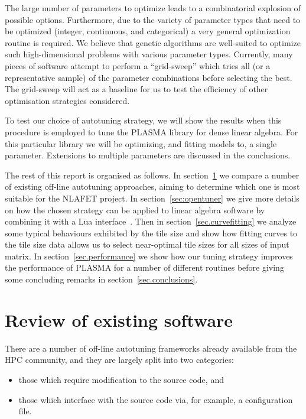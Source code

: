 \documentclass[a4paper,12pt]{article}
\begin{document}
The large number of parameters to optimize leads to a combinatorial
explosion of possible options.
Furthermore,
due to the variety of parameter types that need to be optimized
(integer, continuous, and categorical)
a very general optimization routine is required.
We believe that genetic algorithms are well-suited to optimize
such high-dimensional problems with various parameter types.
Currently,
many pieces of software attempt to perform a ``grid-sweep''
which tries all (or a representative sample)
of the parameter combinations before selecting the best.
The grid-sweep will act as a baseline for us to test the efficiency of
other optimisation strategies considered.

To test our choice of autotuning strategy,
we will show the results when this procedure is employed to tune
the PLASMA library for dense linear algebra.
For this particular library we will be optimizing,
and fitting models to,
a single parameter.
Extensions to multiple parameters are discussed in the conclusions.

The rest of this report is organised as follows.
In section~\ref{sec.review} we compare a number of existing
off-line autotuning approaches,
aiming to determine which one is most suitable
for the NLAFET project.
In section~\ref{sec:opentuner} we give more details
on how the chosen strategy can be applied to linear algebra software
by combining it with a Lua interface~\cite{ierusalimschy2006lua}.
Then in section~\ref{sec.curvefitting} we analyze some typical
behaviours exhibited by the tile size and show how fitting curves
to the tile size data allows us to select near-optimal tile sizes
for all sizes of input matrix.
In section~\ref{sec.performance} we show how our
tuning strategy improves the performance of PLASMA for
a number of different routines before giving some concluding remarks in
section~\ref{sec.conclusions}.

\section{Review of existing software}
\label{sec.review}
There are a number of off-line autotuning frameworks already
available from the HPC community,
and they are largely split into two categories:
\begin{itemize}
\item those which require modification to the source code, and
\item those which interface with the source code via, for example,
  a configuration file.
\end{itemize}
\end{document}
